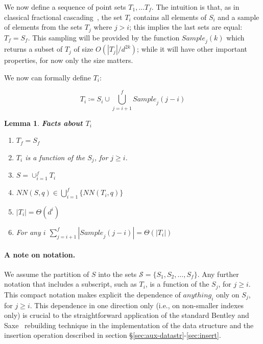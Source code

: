 \documentclass[10pt,a4paper]{amsart}
\newif\ifarxiv
\newif\ifsocg
\newcommand{\Sample}{\mathit{Sample}}
\newcommand{\NN}{\mathit{NN}}
\newcommand{\mcS}{\mathcal{S}}
\newtheorem{lemma}{Lemma}
\begin{document}
We now define a sequence of point sets $T_1,\ldots T_{f}$. The intuition is that, as in classical fractional cascading~\cite{ChazelleG86}, the set $T_i$ contains all elements of 
$S_i$ and a sample of elements from the sets  $T_j$ where $j>i$; this implies the last sets are equal: $T_{f}=S_{f}$.
This sampling will be provided by the function $\Sample_j(k)$ which returns a subset of $T_j$ of size $O(|T_j|/d^{2k})$; while it will have other important properties, for now only the size matters. 

We now can formally define $T_i$:

$$ T_i \coloneqq S_i \cup \bigcup_{j=i+1}^{f} \Sample_j(j-i) $$
\ifarxiv
From this definition we have several observations which we group into a lemma, the proof can be found in Appendix~\ref{sec:lemma1}:
\fi
\ifsocg
From this definition we have several observations which we group into a lemma, the proof can be found in the full version of this paper:
\fi
\begin{lemma}{\bf Facts about $T_i$}  \label{lem:facts}
	\begin{enumerate}
 \setlength{\itemsep}{1pt}
\setlength{\parskip}{0pt}
\setlength{\parsep}{0pt} 
    \item $T_{f}=S_{f}$
    \item $T_i$ is a function of the $S_j$, for $j \geq i$.
    \item $S=\cup_{i=1}^{f} T_i$
    \item $\NN(S,q) \in \bigcup_{i=1}^f \{ \NN(T_i,q)\} $
    \item $|T_i| = \Theta(d^i)$
    \item For any $i$
	$ \sum_{j=i+1}^f |\Sample_j(j-i)|=\Theta(|T_i|)$
\end{enumerate}
\end{lemma}


\paragraph*{A note on notation.}
We assume the partition of $S$ into the sets $\mcS=\{S_1, S_2, \ldots , S_{f}\}$. Any further notation that includes a subscript, such as $T_i$, is a function of the $S_j$, for $j \geq i$. This compact notation makes explicit the dependence of $\mathit{anything}_i$ only on $S_j$, for $j\geq i$. This dependence in one direction only (i.e., on non-smaller indexes only) is crucial to the straightforward application of the standard Bentley and Saxe~\cite{BentleyS80} rebuilding technique in the implementation of the data structure and the insertion operation described in section \S\ref{sec:aux-datastr}-\ref{sec:insert}.
\end{document}
